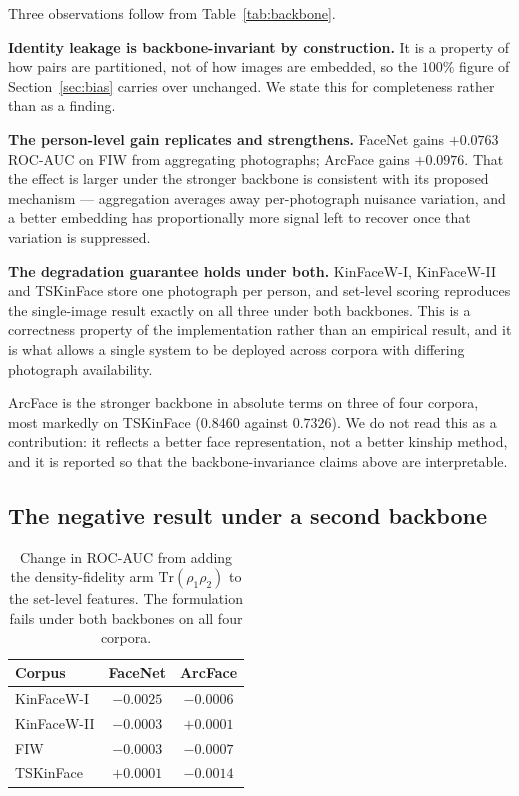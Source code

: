 \documentclass[journal,12pt]{IEEEtran}
\begin{document}
Three observations follow from Table~\ref{tab:backbone}.

\textbf{Identity leakage is backbone-invariant by construction.} It is a
property of how pairs are partitioned, not of how images are embedded, so the
$100\%$ figure of Section~\ref{sec:bias} carries over unchanged. We state this
for completeness rather than as a finding.

\textbf{The person-level gain replicates and strengthens.} FaceNet gains
$+0.0763$ ROC-AUC on FIW from aggregating photographs; ArcFace gains
$+0.0976$. That the effect is larger under the stronger backbone is consistent
with its proposed mechanism --- aggregation averages away per-photograph
nuisance variation, and a better embedding has proportionally more signal left
to recover once that variation is suppressed.

\textbf{The degradation guarantee holds under both.} KinFaceW-I, KinFaceW-II
and TSKinFace store one photograph per person, and set-level scoring reproduces
the single-image result exactly on all three under both backbones. This is a
correctness property of the implementation rather than an empirical result, and
it is what allows a single system to be deployed across corpora with differing
photograph availability.

ArcFace is the stronger backbone in absolute terms on three of four corpora,
most markedly on TSKinFace ($0.8460$ against $0.7326$). We do not read this as
a contribution: it reflects a better face representation, not a better kinship
method, and it is reported so that the backbone-invariance claims above are
interpretable.

\subsection{The negative result under a second backbone}

\begin{table}[t]
\centering
\caption{Change in ROC-AUC from adding the density-fidelity arm
$\mathrm{Tr}(\rho_1\rho_2)$ to the set-level features. The formulation fails
under both backbones on all four corpora.}
\label{tab:backbone_quantum}
\begin{tabular}{lcc}
\toprule
Corpus & FaceNet & ArcFace \\
\midrule
KinFaceW-I & $-0.0025$ & $-0.0006$ \\
KinFaceW-II & $-0.0003$ & $+0.0001$ \\
FIW & $-0.0003$ & $-0.0007$ \\
TSKinFace & $+0.0001$ & $-0.0014$ \\
\bottomrule
\end{tabular}
\end{table}
\end{document}
